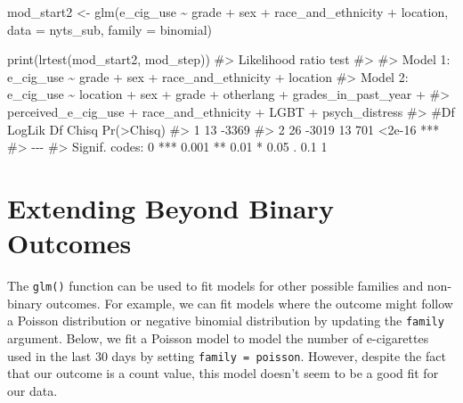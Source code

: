 \documentclass[
  letterpaper,
]{krantz}
\makeatletter
\newenvironment{Shaded}{\begin{snugshade}}{\end{snugshade}}
\newcommand{\AttributeTok}[1]{\textcolor[rgb]{0.40,0.45,0.13}{#1}}
\newcommand{\CommentTok}[1]{\textcolor[rgb]{0.37,0.37,0.37}{#1}}
\newcommand{\FunctionTok}[1]{\textcolor[rgb]{0.28,0.35,0.67}{#1}}
\newcommand{\NormalTok}[1]{\textcolor[rgb]{0.00,0.23,0.31}{#1}}
\newcommand{\OtherTok}[1]{\textcolor[rgb]{0.00,0.23,0.31}{#1}}
\newcommand{\SpecialCharTok}[1]{\textcolor[rgb]{0.37,0.37,0.37}{#1}}
\newenvironment{kframe}{%
\medskip{}
\setlength{\fboxsep}{.8em}
 \def\at@end@of@kframe{}%
 \ifinner\ifhmode%
  \def\at@end@of@kframe{\end{minipage}}%
  \begin{minipage}{\columnwidth}%
 \fi\fi%
 \def\FrameCommand##1{\hskip\@totalleftmargin \hskip-\fboxsep
 \colorbox{shadecolor}{##1}\hskip-\fboxsep
     \hskip-\linewidth \hskip-\@totalleftmargin \hskip\columnwidth}%
 \MakeFramed {\advance\hsize-\width
   \@totalleftmargin\z@ \linewidth\hsize
   \@setminipage}}%
 {\par\unskip\endMakeFramed%
 \at@end@of@kframe}
\renewenvironment{Shaded}{\begin{kframe}}{\end{kframe}}
\makeatother
\begin{document}
\begin{Shaded}
\begin{Highlighting}[]
\NormalTok{mod\_start2 }\OtherTok{\textless{}{-}} \FunctionTok{glm}\NormalTok{(e\_cig\_use }\SpecialCharTok{\textasciitilde{}}\NormalTok{ grade }\SpecialCharTok{+}\NormalTok{ sex }\SpecialCharTok{+}\NormalTok{ race\_and\_ethnicity }\SpecialCharTok{+} 
\NormalTok{                    location, }\AttributeTok{data =}\NormalTok{ nyts\_sub, }\AttributeTok{family =}\NormalTok{ binomial)}
\end{Highlighting}
\end{Shaded}

\begin{Shaded}
\begin{Highlighting}[]
\FunctionTok{print}\NormalTok{(}\FunctionTok{lrtest}\NormalTok{(mod\_start2, mod\_step))}
\CommentTok{\#\textgreater{} Likelihood ratio test}
\CommentTok{\#\textgreater{} }
\CommentTok{\#\textgreater{} Model 1: e\_cig\_use \textasciitilde{} grade + sex + race\_and\_ethnicity + location}
\CommentTok{\#\textgreater{} Model 2: e\_cig\_use \textasciitilde{} location + sex + grade + otherlang + grades\_in\_past\_year + }
\CommentTok{\#\textgreater{}     perceived\_e\_cig\_use + race\_and\_ethnicity + LGBT + psych\_distress}
\CommentTok{\#\textgreater{}   \#Df LogLik Df Chisq Pr(\textgreater{}Chisq)    }
\CommentTok{\#\textgreater{} 1  13  {-}3369                        }
\CommentTok{\#\textgreater{} 2  26  {-}3019 13   701     \textless{}2e{-}16 ***}
\CommentTok{\#\textgreater{} {-}{-}{-}}
\CommentTok{\#\textgreater{} Signif. codes:  0 \textquotesingle{}***\textquotesingle{} 0.001 \textquotesingle{}**\textquotesingle{} 0.01 \textquotesingle{}*\textquotesingle{} 0.05 \textquotesingle{}.\textquotesingle{} 0.1 \textquotesingle{} \textquotesingle{} 1}
\end{Highlighting}
\end{Shaded}

\section{Extending Beyond Binary
Outcomes}\label{extending-beyond-binary-outcomes}

The \texttt{glm()} function can be used to fit models for other possible
families and non-binary outcomes. For example, we can fit models where
the outcome might follow a Poisson distribution or negative binomial
distribution by updating the \texttt{family} argument. Below, we fit a
Poisson model to model the number of e-cigarettes used in the last 30
days by setting \texttt{family\ =\ poisson}. However, despite the fact
that our outcome is a count value, this model doesn't seem to be a good
fit for our data.
\end{document}
